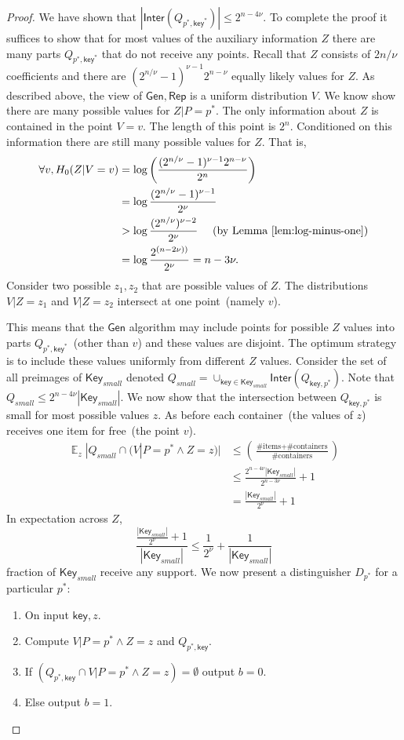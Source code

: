 \documentclass[11pt]{article}
\newcommand{\lemref}[1]{\mbox{Lemma~\ref{#1}}}
\DeclareMathOperator*{\expe}{\mathbb{E}}
\newcommand{\class}[1]{{\ensuremath{\mathsf{#1}}}}
\newcommand{\key}{\ensuremath{\class{key}}\xspace}
\newcommand{\Key}{\ensuremath{\class{Key}}\xspace}
\newcommand{\gen}{\ensuremath{\class{Gen}}\xspace}
\newcommand{\rep}{\ensuremath{\class{Rep}}\xspace}
\newcommand{\inter}{\ensuremath{\class{Inter}}\xspace}
\begin{document}
\begin{proof}
We have shown that $|\inter(Q_{p^*, \key^*})| \le 2^{n-4\nu}$.  
To complete the proof it suffices to show that for most values of the auxiliary information $Z$ there are many parts $Q_{p^*, \key^*}$ that do not receive any points.  
Recall that $Z$ consists of $2n/\nu$ coefficients and there are $(2^{n/\nu}-1)^{\nu-1} 2^{n-\nu}$ equally likely values for $Z$.
 As described above, the view of $\gen, \rep$ is a uniform distribution $V$.  We know show there are many possible values for $Z |P=p^*$.  The only information about $Z$ is contained in the point  $V=v$.  The length of this point is $2^n$.  Conditioned on this information there are still many possible values for $Z$.  That is, 
 \begin{align*}
 \forall v, H_0(Z | V=v) &=\log \left(\frac{(2^{n/\nu}-1)^{\nu-1} 2^{n-\nu}}{2^n} \right)\\
  &= \log \frac{(2^{n/\nu}-1)^{\nu-1}}{2^{\nu}} \\
  &>\log  \frac{(2^{n/\nu})^{\nu-2}}{2^{\nu}} \ \ \ \ \mbox{(by \lemref{lem:log-minus-one})}\\
  &=\log \frac{2^{(n-2\nu))}}{2^\nu} = n -3\nu.
 \end{align*}
Consider two possible $z_1, z_2$ that are possible values of $Z$.  The distributions $V| Z=z_1$ and $V | Z=z_2$ intersect at one point~(namely $v$).  

This means that the $\gen$ algorithm may include points for possible $Z$ values into parts $Q_{p^*, \key^*}$~(other than $v$) and these values are disjoint.  The optimum strategy is to include these values uniformly from different $Z$ values.  Consider the set of all preimages of $\Key_{small}$ denoted $Q_{small} = \cup_{\key\in \Key_{small}} \inter(Q_{\key, p^*})$.  Note that $Q_{small} \le 2^{n-4\nu}|\Key_{small}|$.  We now show that the intersection between $Q_{\key, p^*}$ is small for most possible values $z$.  As before each container~(the values of $z$)  receives one item for free~(the point $v$).
\begin{align*}
\expe_z |Q_{small} \cap (V | P=p^* \wedge Z=z) | &\le \left(\frac{\text{\# items}+\text{\# containers}}{\text{\# containers}}\right)\\
&\le \frac{2^{n-4\nu}|\Key_{small}|}{2^{n - 3\nu}}+1\\
&=\frac{|\Key_{small}|}{2^{\nu}}+1
\end{align*}
In expectation across $Z$, 
\[\frac{\frac{|\Key_{small}|}{2^{\nu}}+1}{|\Key_{small}|} \le \frac{1}{2^\nu}+\frac{1}{|\Key_{small}|} \] fraction of $\Key_{small}$ receive any support.  
We now present a distinguisher $D_{p^*}$ for a particular $p^*$:
\begin{enumerate}
\item On input $\key, z$.
\item Compute $V|P=p^* \wedge Z=z$ and $Q_{p^*, \key}$. 
\item If $(Q_{p^*, \key} \cap V|P=p^* \wedge Z=z) =\emptyset$ output $b=0$.
\item Else output $b=1$.
\end{enumerate}


\end{proof}
\end{document}
